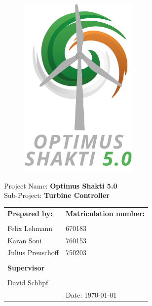 {	\vspace{3cm}
	\begin{figure}[tbh]
		\centering
		\includegraphics[height=9cm]{Figures/logos/Shakti}
	\end{figure}
	
	\begin{minipage}[b][0cm][t]{\textwidth}
		\fontsize{20pt}{20pt}
		\selectfont
		Project Name: \textbf{Optimus Shakti 5.0}\\
		Sub-Project: \textbf{Turbine Controller}
	\end{minipage}
	\begin{minipage}[b][0cm][t]{\textwidth}
		\vspace{1.5cm}
		\fontsize{12pt}{14pt}
		\selectfont
		\begin{tabular}{l b{8cm}}
			\textbf{Prepared by:} & \textbf{Matriculation number:}\\
			\\
			Felix Lehmann & 670183 \\
			Karan Soni & 760153\\
			Julius Preuschoff & 750203 \\
			\\
			\textbf{Supervisor} & \\
			\\
			David Schlipf & \\
			& Date: \today\\
		\end{tabular}
	\end{minipage}
}
